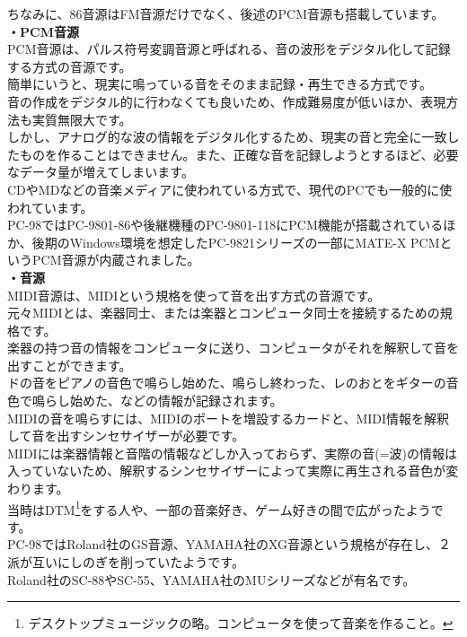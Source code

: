 \documentclass[b5paper,9pt,platex,dvipdfmx]{jsarticle}
\begin{document}
\begin{multicols}{3}
\begin{enumerate}
  ちなみに、86音源はFM音源だけでなく、後述のPCM音源も搭載しています。\\
  {\bf ・PCM音源 \\}
  PCM音源は、パルス符号変調音源と呼ばれる、音の波形をデジタル化して記録する方式の音源です。\\
  簡単にいうと、現実に鳴っている音をそのまま記録・再生できる方式です。\\
  音の作成をデジタル的に行わなくても良いため、作成難易度が低いほか、表現方法も実質無限大です。\\
  しかし、アナログ的な波の情報をデジタル化するため、現実の音と完全に一致したものを作ることはできません。また、正確な音を記録しようとするほど、必要なデータ量が増えてしまいます。\\
  CDやMDなどの音楽メディアに使われている方式で、現代のPCでも一般的に使われています。\\
  PC-98ではPC-9801-86や後継機種のPC-9801-118にPCM機能が搭載されているほか、後期のWindows環境を想定したPC-9821シリーズの一部にMATE-X PCMというPCM音源が内蔵されました。\\
  {\bf ・音源 \\}
  MIDI音源は、MIDIという規格を使って音を出す方式の音源です。\\
  元々MIDIとは、楽器同士、または楽器とコンピュータ同士を接続するための規格です。\\
  楽器の持つ音の情報をコンピュータに送り、コンピュータがそれを解釈して音を出すことができます。\\
  ドの音をピアノの音色で鳴らし始めた、鳴らし終わった、レのおとをギターの音色で鳴らし始めた、などの情報が記録されます。\\
  MIDIの音を鳴らすには、MIDIのポートを増設するカードと、MIDI情報を解釈して音を出すシンセサイザーが必要です。\\
  MIDIには楽器情報と音階の情報などしか入っておらず、実際の音(=波)の情報は入っていないため、解釈するシンセサイザーによって実際に再生される音色が変わります。\\
  当時はDTM\footnote{デスクトップミュージックの略。コンピュータを使って音楽を作ること。}をする人や、一部の音楽好き、ゲーム好きの間で広がったようです。\\
  PC-98ではRoland社のGS音源、YAMAHA社のXG音源という規格が存在し、２派が互いにしのぎを削っていたようです。\\
  Roland社のSC-88やSC-55、YAMAHA社のMUシリーズなどが有名です。\\
\end{enumerate}
\end{multicols}
\end{document}
